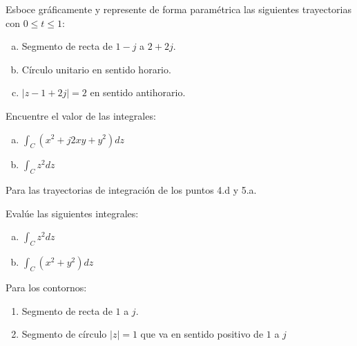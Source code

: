 \begin{ejercicio}
    Esboce gráficamente y represente de forma paramétrica las siguientes trayectorias con $0 \leq t \leq 1$:
    \begin{enumerate}[a.]
        \item Segmento de recta de $1-j$ a $2+2j$.
        \item Círculo unitario en sentido horario.
        \item $|z-1+2j|=2$ en sentido antihorario.
    \end{enumerate}
\end{ejercicio}

\begin{ejercicio}
    Encuentre el valor de las integrales:
    \begin{enumerate}[a.]
        \item $\displaystyle\int_C (x^2+j2xy+y^2)dz$
        \item $\displaystyle\int_C z^2 dz$
    \end{enumerate}
    Para las trayectorias de integración de los puntos 4.d y 5.a.
\end{ejercicio}

\begin{ejercicio}
    Evalúe las siguientes integrales:
    \begin{enumerate}[a.]
        \item $\displaystyle\int_C z^2 dz$
        \item $\displaystyle\int_C (x^2+y^2) dz$
    \end{enumerate}
    Para los contornos:
    \begin{enumerate}
        \item Segmento de recta de $1$ a $j$.
        \item Segmento de círculo $|z|=1$ que va en sentido positivo de $1$ a $j$
    \end{enumerate}
\end{ejercicio}
